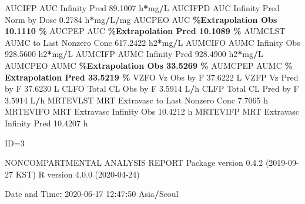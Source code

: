\documentclass[
  12pt,
]{krantz}
\newenvironment{Shaded}{\begin{snugshade}}{\end{snugshade}}
\newcommand{\DecValTok}[1]{\textcolor[rgb]{0.00,0.00,0.81}{#1}}
\newcommand{\FloatTok}[1]{\textcolor[rgb]{0.00,0.00,0.81}{#1}}
\newcommand{\NormalTok}[1]{#1}
\newcommand{\OperatorTok}[1]{\textcolor[rgb]{0.81,0.36,0.00}{\textbf{#1}}}
\newcommand{\StringTok}[1]{\textcolor[rgb]{0.31,0.60,0.02}{#1}}
\begin{document}
\begin{Shaded}
\begin{Highlighting}[]
\NormalTok{AUCIFP     AUC Infinity Pred                              }\FloatTok{89.1007}\NormalTok{ h}\OperatorTok{*}\NormalTok{mg}\OperatorTok{/}\NormalTok{L}
\NormalTok{AUCIFPD    AUC Infinity Pred Norm by Dose                  }\FloatTok{0.2784}\NormalTok{ h}\OperatorTok{*}\NormalTok{mg}\OperatorTok{/}\NormalTok{L}\OperatorTok{/}\NormalTok{mg}
\NormalTok{AUCPEO     AUC }\OperatorTok{\%Extrapolation Obs                         10.1110 \%}
\NormalTok{AUCPEP     AUC }\OperatorTok{\%Extrapolation Pred                        10.1089 \%}
\NormalTok{AUMCLST    AUMC to Last Nonzero Conc                     }\FloatTok{617.2422}\NormalTok{ h2}\OperatorTok{*}\NormalTok{mg}\OperatorTok{/}\NormalTok{L}
\NormalTok{AUMCIFO    AUMC Infinity Obs                             }\FloatTok{928.5600}\NormalTok{ h2}\OperatorTok{*}\NormalTok{mg}\OperatorTok{/}\NormalTok{L}
\NormalTok{AUMCIFP    AUMC Infinity Pred                            }\FloatTok{928.4900}\NormalTok{ h2}\OperatorTok{*}\NormalTok{mg}\OperatorTok{/}\NormalTok{L}
\NormalTok{AUMCPEO    AUMC }\OperatorTok{\%Extrapolation Obs                        33.5269 \%}
\NormalTok{AUMCPEP    AUMC }\OperatorTok{\% Extrapolation Pred                      33.5219 \%}
\NormalTok{VZFO       Vz Obs by F                                    }\FloatTok{37.6222}\NormalTok{ L}
\NormalTok{VZFP       Vz Pred by F                                   }\FloatTok{37.6230}\NormalTok{ L}
\NormalTok{CLFO       Total CL Obs by F                               }\FloatTok{3.5914}\NormalTok{ L}\OperatorTok{/}\NormalTok{h}
\NormalTok{CLFP       Total CL Pred by F                              }\FloatTok{3.5914}\NormalTok{ L}\OperatorTok{/}\NormalTok{h}
\NormalTok{MRTEVLST   MRT Extravasc to Last Nonzero Conc              }\FloatTok{7.7065}\NormalTok{ h}
\NormalTok{MRTEVIFO   MRT Extravasc Infinity Obs                     }\FloatTok{10.4212}\NormalTok{ h}
\NormalTok{MRTEVIFP   MRT Extravasc Infinity Pred                    }\FloatTok{10.4207}\NormalTok{ h}





\NormalTok{ID=}\DecValTok{3}

\NormalTok{                        NONCOMPARTMENTAL ANALYSIS REPORT}
\NormalTok{                       Package version }\DecValTok{0}\NormalTok{.}\FloatTok{4.2}\NormalTok{ (}\DecValTok{2019{-}09{-}27}\NormalTok{ KST)}
\NormalTok{                          R version }\DecValTok{4}\NormalTok{.}\FloatTok{0.0}\NormalTok{ (}\DecValTok{2020{-}04{-}24}\NormalTok{)}

\NormalTok{Date and Time}\OperatorTok{:}\StringTok{ }\DecValTok{2020{-}06{-}17} \DecValTok{12}\OperatorTok{:}\DecValTok{47}\OperatorTok{:}\DecValTok{50}\NormalTok{ Asia}\OperatorTok{/}\NormalTok{Seoul}


\end{Highlighting}
\end{Shaded}
\end{document}
